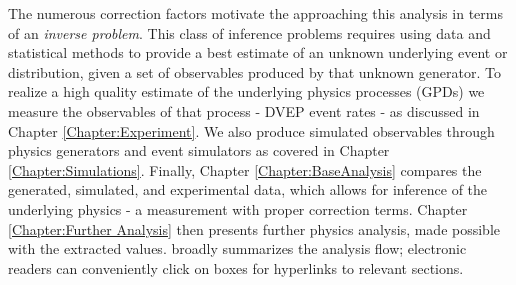         The numerous correction factors motivate the approaching this analysis in terms of an \textit{inverse problem}. This class of inference problems requires using data and statistical methods to provide a best estimate of an unknown underlying event or distribution, given a set of observables produced by that unknown generator. To realize a high quality estimate of the underlying physics processes (GPDs) we measure the observables of that process - DVEP event rates - as discussed in Chapter \ref{Chapter:Experiment}. We also produce simulated observables through physics generators and event simulators as covered in Chapter \ref{Chapter:Simulations}. Finally, Chapter \ref{Chapter:BaseAnalysis} compares the generated, simulated, and experimental data, which allows for inference of the underlying physics - a \xsec measurement with proper correction terms. Chapter \ref{Chapter:Further Analysis} then presents further physics analysis, made possible with the extracted \xsec values.  broadly summarizes the analysis flow; electronic readers can conveniently click on boxes for hyperlinks to relevant sections. 



